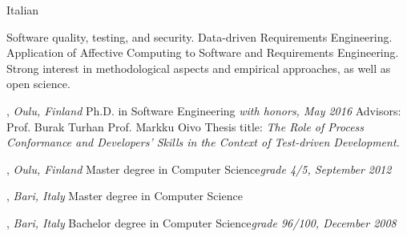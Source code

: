 \documentclass[9pt]{article}
\begin{document}
\bigskip
\bigskip
\bigskip
\flushleft
%

\medskip
\bigskip

{}

\noindent Italian

\medskip

\textheight=580pt

\noindent Software quality, testing, and security. Data-driven Requirements Engineering. Application of Affective Computing to Software and Requirements Engineering.
Strong interest in methodological aspects and empirical approaches, as well as open science.
\bigskip
\medskip



, \emph{Oulu, Finland} \vspace{0.01in} 
\newline Ph.D. in Software Engineering {\em with honors, May 2016}
\newline Advisors: Prof. Burak Turhan \amper{} Prof. Markku Oivo
\newline Thesis title: {\em The Role of Process Conformance and Developers' Skills in the Context of Test-driven Development.}

\bigskip


, \emph{Oulu, Finland} \vspace{0.01in}  
\newline\noindent Master degree in Computer Science{\em grade 4/5, September 2012}

\bigskip

, \emph{Bari, Italy} \vspace{0.01in}  
\newline\noindent Master degree in Computer Science


\bigskip

, \emph{Bari, Italy} \vspace{0.01in}  
\newline\noindent Bachelor degree in Computer Science{\em grade 96/100, December 2008}

\bigskip
\medskip
{}
\end{document}
